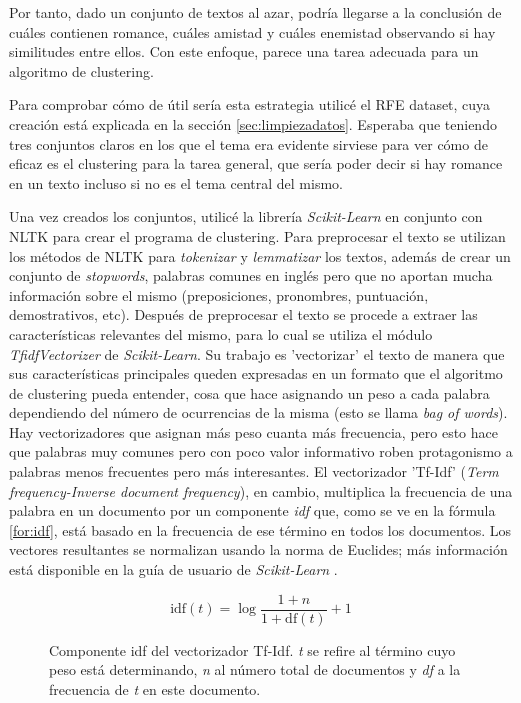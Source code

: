 \documentclass{pre-tfg}
\begin{document}
Por tanto, dado un conjunto de textos al azar, podría llegarse a la conclusión de cuáles contienen romance, cuáles amistad y cuáles enemistad observando si hay similitudes entre ellos. Con este enfoque, parece una tarea adecuada para un algoritmo de clustering.

Para comprobar cómo de útil sería esta estrategia utilicé el RFE dataset, cuya creación está explicada en la sección \ref{sec:limpiezadatos}. Esperaba que teniendo tres conjuntos claros en los que el tema era evidente sirviese para ver cómo de eficaz es el clustering para la tarea general, que sería poder decir si hay romance en un texto incluso si no es el tema central del mismo.


Una vez creados los conjuntos, utilicé la librería \textit{Scikit-Learn} en conjunto con NLTK para crear el programa de clustering. Para preprocesar el texto se utilizan los métodos de NLTK para \textit{tokenizar} y \textit{lemmatizar} los textos, además de crear un conjunto de \textit{stopwords}, palabras comunes en inglés pero que no aportan mucha información sobre el mismo (preposiciones, pronombres, puntuación, demostrativos, etc).
Después de preprocesar el texto se procede a extraer las características relevantes del mismo, para lo cual se utiliza el módulo \textit{TfidfVectorizer} de \textit{Scikit-Learn}. Su trabajo es 'vectorizar' el texto de manera que sus características principales queden expresadas en un formato que el algoritmo de clustering pueda entender, cosa que hace asignando un peso a cada palabra dependiendo del número de ocurrencias de la misma (esto se llama \textit{bag of words}). Hay vectorizadores que asignan más peso cuanta más frecuencia, pero esto hace que palabras muy comunes pero con poco valor informativo roben protagonismo a palabras menos frecuentes pero más interesantes. El vectorizador 'Tf-Idf' (\textit{Term frequency-Inverse document frequency}), en cambio, multiplica la frecuencia de una palabra en un documento por un componente \textit{idf} que, como se ve en la fórmula \ref{for:idf}, está basado en la frecuencia de ese término en todos los documentos. Los vectores resultantes se normalizan usando la norma de Euclides; más información está disponible en la guía de usuario de \textit{Scikit-Learn} \cite{sklearn_feature}. 

\begin{figure}
	\begin{equation}
	\text{idf}(t) = \log{\frac{1+n}{1+\text{df}(t)}}+1 
	\label{for:idf}
	\end{equation}
	\caption{Componente idf del vectorizador Tf-Idf. \textit
		{t} se refire al término cuyo peso está determinando, \textit{n} al número total de documentos y \textit{df} a la frecuencia de \textit{t} en este documento.}
	
\end{figure}
\end{document}
